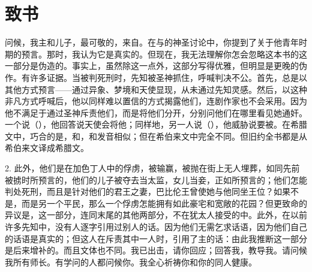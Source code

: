 
\chapter{致书}


\par

问候，我主和儿子，最可敬的，来自。在与的神圣讨论中，你提到了关于他青年时期的预言。那时，我认为它是真实的。但现在，我无法理解你怎会忽略这本书的这一部分是伪造的。事实上，虽然除这一点外，这部分写得优雅，但明显是更晚的伪作。有许多证据。当被判死刑时，先知被圣神抓住，呼喊判决不公。首先，总是以其他方式预言——通过异象、梦境和天使显现，从未通过先知灵感。然后，以这种非凡方式呼喊后，他以同样难以置信的方式揭露他们，连剧作家也不会采用。因为他不满足于通过圣神斥责他们，而是将他们分开，分别问他们在哪里看见她通奸。一个说（），他回答说天使会将他；同样地，另一人说（），他威胁说要被。在希腊文中，巧合的是，和，和发音相似；但在希伯来文中完全不同。但旧约全书都是从希伯来文译成希腊文。\par

2. 此外，他们是在加色丁人中的俘虏，被输赢，被抛在街上无人埋葬，如同先前被掳时所预言的，他们的儿子被夺去当太监，女儿当妾，正如所预言的；他们怎能判处死刑，而且是针对他们的君王之妻，巴比伦王曾使她与他同坐王位？如果不是，而是另一个平民，那么一个俘虏怎能拥有如此豪宅和宽敞的花园？但更致命的异议是，这一部分，连同末尾的其他两部分，不在犹太人接受的中。此外，在以前许多先知中，没有人逐字引用过别人的话。因为他们无需乞求话语，因为他们自己的话语是真实的；但这人在斥责其中一人时，引用了主的话：由此我推断这一部分是后来增补的。而且文体也不同。我已出击，请你回应；回答我，教导我。请问候我所有师长。有学问的人都问候你。我全心祈祷你和你的同人健康。\par

